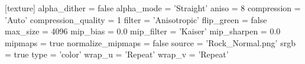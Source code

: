 [texture]
alpha_dither = false
alpha_mode = 'Straight'
aniso = 8
compression = 'Auto'
compression_quality = 1
filter = 'Anisotropic'
flip_green = false
max_size = 4096
mip_bias = 0.0
mip_filter = 'Kaiser'
mip_sharpen = 0.0
mipmaps = true
normalize_mipmaps = false
source = 'Rock_Normal.png'
srgb = true
type = 'color'
wrap_u = 'Repeat'
wrap_v = 'Repeat'